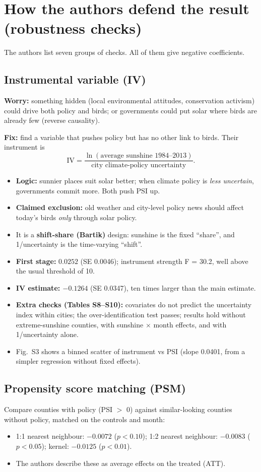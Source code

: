 \documentclass[11pt]{article}
\begin{document}
\section{How the authors defend the result (robustness checks)}
The authors list seven groups of checks. All of them give negative coefficients.

\subsection{Instrumental variable (IV)}
\textbf{Worry:} something hidden (local environmental attitudes, conservation activism) could drive both policy and birds; or governments could put solar where birds are already few (reverse causality).

\textbf{Fix:} find a variable that pushes policy but has no other link to birds. Their instrument is
\[
\text{IV} = \frac{\ln(\text{average sunshine 1984--2013})}{\text{city climate-policy uncertainty}}.
\]
\begin{itemize}
\item \textbf{Logic:} sunnier places suit solar better; when climate policy is \emph{less uncertain}, governments commit more. Both push PSI up.
\item \textbf{Claimed exclusion:} old weather and city-level policy news should affect today's birds \emph{only} through solar policy.
\item It is a \textbf{shift-share (Bartik)} design: sunshine is the fixed ``share'', and 1/uncertainty is the time-varying ``shift''.
\item \textbf{First stage:} $0.0252$ (SE 0.0046); instrument strength F = 30.2, well above the usual threshold of 10.
\item \textbf{IV estimate: $-0.1264$} (SE 0.0347), ten times larger than the main estimate.
\item \textbf{Extra checks (Tables S8--S10):} covariates do not predict the uncertainty index within cities; the over-identification test passes; results hold without extreme-sunshine counties, with sunshine $\times$ month effects, and with 1/uncertainty alone.
\item Fig.\ S3 shows a binned scatter of instrument vs PSI (slope 0.0401, from a simpler regression without fixed effects).
\end{itemize}

\subsection{Propensity score matching (PSM)}
Compare counties with policy (PSI $>$ 0) against similar-looking counties without policy, matched on the controls and month:
\begin{itemize}
\item 1:1 nearest neighbour: $-0.0072$ ($p<0.10$); 1:2 nearest neighbour: $-0.0083$ ($p<0.05$); kernel: $-0.0125$ ($p<0.01$).
\item The authors describe these as average effects on the treated (ATT).
\end{itemize}
\end{document}
